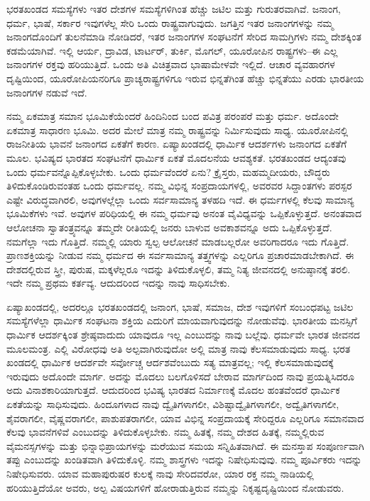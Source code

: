 ಭರತಖಂಡದ ಸಮಸ್ಯೆಗಳು ಇತರ ದೇಶಗಳ ಸಮಸ್ಯೆಗಳಿಗಿಂತ ಹೆಚ್ಚು ಜಟಿಲ ಮತ್ತು ಗುರುತರವಾಗಿವೆ. ಜನಾಂಗ, ಧರ್ಮ, ಭಾಷೆ, ಸರ್ಕಾರ ಇವುಗಳೆಲ್ಲ ಸೇರಿ ಒಂದು ರಾಷ್ಟ್ರವಾಗುವುದು. ಜಗತ್ತಿನ ಇತರ ಜನಾಂಗಗಳನ್ನು ನಮ್ಮ ಜನಾಂಗದೊಂದಿಗೆ ತುಲನೆಮಾಡಿ ನೋಡಿದರೆ, ಇತರ ಜನಾಂಗಗಳ ಸಂಘಟನೆಗೆ ಸೇರಿದ ಸಾಮಗ್ರಿಗಳು ನಮ್ಮ ದೇಶಕ್ಕಿಂತ ಕಡಮೆಯಾಗಿವೆ. ಇಲ್ಲಿ ಆರ್ಯ, ದ್ರಾವಿಡ, ಟಾರ್ಟರ್​, ತುರ್ಕಿ, ಮೊಗಲ್​, ಯೂರೋಪಿನ ರಾಷ್ಟ್ರಗಳು–ಈ ಎಲ್ಲ ಜನಾಂಗಗಳ ರಕ್ತವು ಹರಿಯುತ್ತಿದೆ. ಒಂದು ಅತಿ ವಿಚಿತ್ರವಾದ ಭಾಷಾಮೇಳವೇ ಇಲ್ಲಿದೆ. ಆಚಾರ ವ್ಯವಹಾರಗಳ ದೃಷ್ಟಿಯಿಂದ, ಯೂರೋಪಿಯನರಿಗೂ ಪ್ರಾಚ್ಯ\-ರಾಷ್ಟ್ರಗಳಿಗೂ ಇರುವ ಭಿನ್ನತೆಗಿಂತ ಹೆಚ್ಚು ಭಿನ್ನತೆಯು ಎರಡು ಭಾರತೀಯ ಜನಾಂಗಗಳ ನಡುವೆ ಇದೆ. 

ನಮ್ಮ ಏಕಮಾತ್ರ ಸಮಾನ ಭೂಮಿಕೆಯೆಂದರೆ ಹಿಂದಿನಿಂದ ಬಂದ ಪವಿತ್ರ ಪರಂಪರೆ ಮತ್ತು ಧರ್ಮ. ಅದೊಂದೇ ಏಕಮಾತ್ರ ಸಾಧಾರಣ ಭೂಮಿ. ಅದರ ಮೇಲೆ ಮಾತ್ರ ನಮ್ಮ ರಾಷ್ಟ್ರವನ್ನು ನಿರ್ಮಿಸುವುದು ಸಾಧ್ಯ. ಯೂರೋಪಿನಲ್ಲಿ ರಾಜನೀತಿಯ ಭಾವನೆ ಜನಾಂಗದ ಏಕತೆಗೆ ಕಾರಣ. ಏಷ್ಯಾಖಂಡದಲ್ಲಿ ಧಾರ್ಮಿಕ ಆದರ್ಶಗಳು ಜನಾಂಗದ ಏಕತೆಗೆ ಮೂಲ. ಭವಿಷ್ಯದ ಭಾರತದ ಸಂಘಟನೆಗೆ ಧಾರ್ಮಿಕ ಏಕತೆ ಮೊದಲನೆಯ ಆವಶ್ಯಕತೆ. ಭರತಖಂಡದ ಆದ್ಯಂತವು ಒಂದು ಧರ್ಮವನ್ನೊಪ್ಪಿಕೊಳ್ಳಬೇಕು. ಒಂದು ಧರ್ಮವೆಂದರೆ ಏನು? ಕ್ರೈಸ್ತರು, ಮಹಮ್ಮದೀಯರು, ಬೌದ್ಧರು ತಿಳಿದುಕೊಂಡಿರುವಂತಹ ಒಂದು ಧರ್ಮವಲ್ಲ. ನಮ್ಮ ವಿಭಿನ್ನ ಸಂಪ್ರದಾಯಗಳಲ್ಲಿ, ಅವರವರ ಸಿದ್ದಾಂತಗಳು ಪರಸ್ಪರ ಎಷ್ಟೇ ವಿರುದ್ಧವಾಗಿರಲಿ, ಅವುಗಳಲ್ಲೆಲ್ಲಾ ಒಂದು ಸರ್ವಸಾಮಾನ್ಯ ತಳಹದಿ ಇದೆ. ಈ ಧರ್ಮಗಳಲ್ಲಿ ಕೆಲವು ಸಾಮಾನ್ಯ ಭೂಮಿಕೆಗಳು ಇವೆ. ಅವುಗಳ ಪರಿಧಿಯಲ್ಲಿ ಈ ನಮ್ಮ ಧರ್ಮವು ಅನಂತ ವೈವಿಧ್ಯವನ್ನು ಒಪ್ಪಿಕೊಳ್ಳುತ್ತದೆ. ಅನಂತವಾದ ಆಲೋಚನಾ ಸ್ವಾತಂತ್ರ್ಯವನ್ನೂ ತಮ್ಮದೇ ರೀತಿಯಲ್ಲಿ ಜನರು ಬಾಳುವ ಅವಕಾಶವನ್ನೂ ಅದು ಒಪ್ಪಿಕೊಳ್ಳುತ್ತದೆ. ನಮಗೆಲ್ಲಾ ಇದು ಗೊತ್ತಿದೆ. ನಮ್ಮಲ್ಲಿ ಯಾರು ಸ್ವಲ್ಪ ಆಲೋಚನೆ ಮಾಡಬಲ್ಲರೋ ಅವರಿಗಾದರೂ ಇದು ಗೊತ್ತಿದೆ. ಪ್ರಾಣಶಕ್ತಿಯನ್ನು ನೀಡುವ ನಮ್ಮ ಧರ್ಮದ ಈ ಸರ್ವಸಾಮಾನ್ಯ ತತ್ತ್ವಗಳನ್ನು ಎಲ್ಲರಿಗೂ ಪ್ರಚಾರಮಾಡಬೇಕಾಗಿದೆ. ಈ ದೇಶದಲ್ಲಿರುವ ಸ್ತ್ರೀ, ಪುರುಷ, ಮಕ್ಕಳೆಲ್ಲರೂ ಇದನ್ನು ತಿಳಿದುಕೊಳ್ಳಲಿ, ತಮ್ಮ ನಿತ್ಯ ಜೀವನದಲ್ಲಿ ಅನುಷ್ಠಾನಕ್ಕೆ ತರಲಿ. ಇದೇ ನಮ್ಮ ಪ್ರಥಮ ಕರ್ತವ್ಯ. ಆದುದರಿಂದ ಇದನ್ನು ನಾವು ಸಾಧಿಸಬೇಕು. 

ಏಷ್ಯಾಖಂಡದಲ್ಲಿ, ಅದರಲ್ಲೂ ಭರತಖಂಡದಲ್ಲಿ ಜನಾಂಗ, ಭಾಷೆ, ಸಮಾಜ, ದೇಶ ಇವುಗಳಿಗೆ ಸಂಬಂಧಪಟ್ಟ ಜಟಿಲ ಸಮಸ್ಯೆಗಳೆಲ್ಲಾ ಧಾರ್ಮಿಕ ಸಂಘಟನಾ ಶಕ್ತಿಯ ಎದುರಿಗೆ ಮಾಯವಾಗುವುದನ್ನು ನೋಡುವೆವು. ಭಾರತೀಯ ಮನಸ್ಸಿಗೆ ಧಾರ್ಮಿಕ ಆದರ್ಶಕ್ಕಿಂತ ಶ್ರೇಷ್ಠವಾದುದು ಯಾವುದೂ ಇಲ್ಲ ಎಂಬುದನ್ನು ನಾವು ಬಲ್ಲೆವು. ಧರ್ಮವೇ ಭಾರತ ಜೀವನದ ಮೂಲಮಂತ್ರ. ಎಲ್ಲಿ ವಿರೋಧವು ಅತಿ ಅಲ್ಪವಾಗಿರುವುದೋ ಅಲ್ಲಿ ಮಾತ್ರ ನಾವು ಕೆಲಸಮಾಡುವುದು ಸಾಧ್ಯ. ಭರತ ಖಂಡದಲ್ಲಿ ಧಾರ್ಮಿಕ ಆದರ್ಶವೇ ಸರ್ವೋಚ್ಚ ಆರ್ದಶವೆಂಬುದು ಸತ್ಯ ಮಾತ್ರವಲ್ಲ; ಇಲ್ಲಿ ಕೆಲಸಮಾಡುವುದಕ್ಕೆ ಇರುವುದು ಅದೊಂದೇ ಮಾರ್ಗ. ಅದನ್ನು ಮೊದಲು ಬಲಗೊಳಿಸದೆ ಬೇರಾವ ಮಾರ್ಗದಿಂದ ನಾವು ಪ್ರಯತ್ನಿಸಿದರೂ ಅದು ವಿನಾಶಕಾರಿಯಾಗುತ್ತದೆ. ಆದುದರಿಂದ ಭವಿಷ್ಯ ಭಾರತದ ನಿರ್ಮಾಣಕ್ಕೆ ಮೊದಲ ಹಂತವೆಂದರೆ ಧಾರ್ಮಿಕ ಏಕತೆಯನ್ನು ಸಾಧಿಸುವುದು. ಹಿಂದೂಗಳಾದ ನಾವು ದ್ವೈತಿಗಳಾಗಲೀ, ವಿಶಿಷ್ಟಾದ್ವೈತಿಗಳಾಗಲೀ, ಅದ್ವೈತಿಗಳಾಗಲೀ, ಶೈವರಾಗಲೀ, ವೈಷ್ಣವರಾಗಲೀ, ಪಾಶುಪತರಾಗಲೀ, ಯಾವ ವಿಭಿನ್ನ ಸಂಪ್ರದಾಯಕ್ಕೆ ಸೇರಿದ್ದರೂ ಎಲ್ಲರಿಗೂ ಸಮಾನವಾದ ಕೆಲವು ಭಾವನೆಗಳಿವೆ ಎಂಬುದನ್ನು ತಿಳಿದುಕೊಳ್ಳಬೇಕು. ನಮ್ಮ ಹಿತಕ್ಕೆ, ನಮ್ಮ ದೇಶದ ಹಿತಕ್ಕೆ, ನಮ್ಮಲ್ಲಿರುವ ವೈಮನಸ್ಸಗಳನ್ನು ಮತ್ತು ಭಿನ್ನಾಭಿಪ್ರಾಯಗಳನ್ನು ಮರೆಯುವ ಸಮಯ ಸನ್ನಿಹಿತವಾಗಿದೆ. ಈ ಮನಸ್ತಾಪ ಸಂಪೂರ್ಣವಾಗಿ ತಪ್ಪು ಎಂಬುದನ್ನು ಖಂಡಿತವಾಗಿ ತಿಳಿದುಕೊಳ್ಳಿ. ನಮ್ಮ ಶಾಸ್ತ್ರಗಳು ಇದನ್ನು ನಿಷೇಧಿಸುವುವು. ನಮ್ಮ ಪೂರ್ವಿಕರು ಇದನ್ನು ನಿಷೇಧಿಸುವರು. ಯಾವ ಮಹಾಪುರುಷರ ಕುಲಕ್ಕೆ ನಾವು ಸೇರಿದವರೋ, ಯಾರ ರಕ್ತ ನಮ್ಮ ನಾಡಿಯಲ್ಲಿ ಹರಿಯುತ್ತಿದೆಯೋ ಅವರು, ಅಲ್ಪ ವಿಷಯಗಳಿಗೆ ಹೋರಾಡುತ್ತಿರುವ ನಮ್ಮನ್ನು ನಿಕೃಷ್ಟದೃಷ್ಟಿಯಿಂದ ನೋಡುವರು. 

